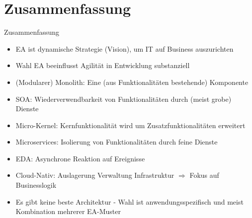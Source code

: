 \section*{Zusammenfassung}

\begin{frame}{Zusammenfassung}
    \begin{itemize}
        \item EA ist dynamische Strategie (Vision), um IT auf Business auszurichten
        \item Wahl EA beeinflusst Agilität in Entwicklung substanziell
        \item (Modularer) Monolith: Eine (aus Funktionalitäten bestehende) Komponente
        \item SOA: Wiederverwendbarkeit von Funktionalitäten durch (meist grobe) Dienste
        \item Micro-Kernel: Kernfunktionalität wird um Zusatzfunktionalitäten erweitert
        \item Microservices: Isolierung von Funktionalitäten durch feine Dienste
        \item EDA: Asynchrone Reaktion auf Ereignisse
        \item Cloud-Nativ: Auslagerung Verwaltung Infrastruktur $\Rightarrow$ Fokus auf Businesslogik
        \item Es gibt keine beste Architektur - Wahl ist anwendungsspezifisch und meist Kombination mehrerer EA-Muster
    \end{itemize}
\end{frame}

